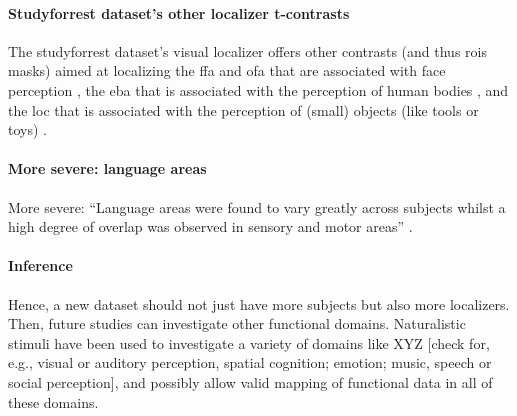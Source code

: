 \paragraph{Studyforrest dataset's other localizer t-contrasts}



The studyforrest dataset's visual localizer \citep{sengupta2016extension} offers
other contrasts (and thus \acp{roi} masks) aimed at localizing the \ac{ffa} and
\ac{ofa} that are associated with face perception \citep{kanwisher1997ffa,
pitcher2011occipitalfacearea}, the \ac{eba} that is associated with the
perception of human bodies \citep{downing2001bodyarea}, and the \ac{loc} that is
associated with the perception of (small) objects (like tools or toys)
\citep{malach1995loc}.

\paragraph{More severe: language areas}


%
More severe: ``Language areas were found to vary greatly across subjects whilst
a high degree of overlap was observed in sensory and motor areas''
\citep{frost2012measuring}.


\paragraph{Inference}



%
Hence, a new dataset should not just have more subjects but also more
localizers.
%
Then, future studies can investigate other functional domains.
%
Naturalistic stimuli have been used to investigate a variety of domains like XYZ
[check for, e.g., visual or auditory perception, spatial cognition; emotion;
music, speech or social perception], and possibly allow valid mapping of
functional data in all of these domains.


